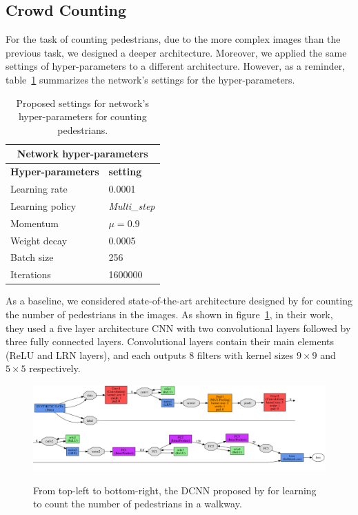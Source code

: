 \subsection{Crowd Counting}
\label{subsec:ucsdarch}

For the task of counting pedestrians, due to the more complex images than the previous task, we designed a deeper architecture. Moreover, we applied the same settings of hyper-parameters to a different architecture. However, as a reminder, table~\ref{hypar2} summarizes the network's settings for the hyper-parameters.

\begin{table}[H]
	\centering
	\begin{tabular}{ |p{3.8cm}|p{1.7cm}| }
	\hline 
	\multicolumn{2}{|c|}{\textbf{Network hyper-parameters}} \\
	\hline
	\hline
	\textbf{Hyper-parameters} & \textbf{setting }\\
	\hline
	Learning rate & 0.0001\\
	\hline
	Learning policy    & \textit{Multi\_step} \\
	\hline
	Momentum & $\mu = 0.9$\\
	\hline
	Weight decay & 0.0005 \\
	\hline
	Batch size & 256 \\
	\hline
	Iterations & 1600000 \\
	\hline
	\end{tabular}
		\caption{Proposed settings for network's hyper-parameters for counting pedestrians.}
		\label{hypar2}
\end{table} 

As a baseline, we considered state-of-the-art architecture designed by \citealt*{segui2015learning} for counting the number of pedestrians in the images. As shown in figure~\ref{santiucsdnet}, in their work, they used a five layer architecture CNN with two convolutional layers followed by three fully connected layers. Convolutional layers contain their main elements (ReLU and LRN layers), and each outputs 8 filters with kernel sizes $9\times9$ and $5\times5$ respectively. 

\begin{figure}[H]
  \centering
   {\includegraphics[width=1.00\textwidth]{images/santiucsd}}
	\caption{From top-left to bottom-right, the DCNN proposed by \cite{segui2015learning} for learning to count the number of pedestrians in a walkway.}
	\label{santiucsdnet}
\end{figure}

